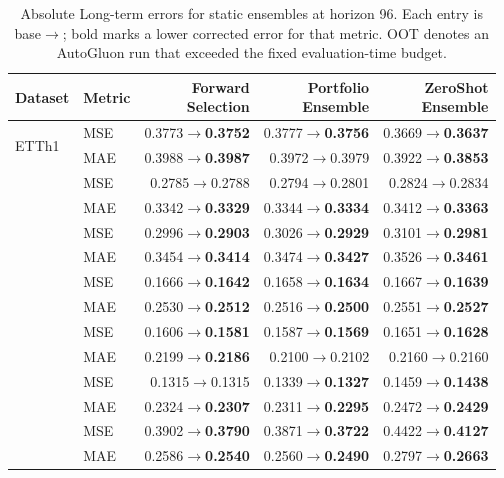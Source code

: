\begin{table}[t]
\centering
\small
\setlength{\tabcolsep}{5pt}
\caption{Absolute Long-term errors for static ensembles at horizon 96. Each entry is base$\rightarrow$\method{}; bold marks a lower corrected error for that metric. OOT denotes an AutoGluon run that exceeded the fixed evaluation-time budget.}
\label{tab:strong-long-term-absolute-ensembles}
\begin{tabular}{llrrr}
\toprule
Dataset & Metric & \shortstack{Forward\\Selection} & \shortstack{Portfolio\\Ensemble} & \shortstack{ZeroShot\\Ensemble}\\
\midrule
\multirow{2}{*}{ETTh1} & MSE & 0.3773$\rightarrow$\textbf{0.3752} & 0.3777$\rightarrow$\textbf{0.3756} & 0.3669$\rightarrow$\textbf{0.3637}\\
 & MAE & 0.3988$\rightarrow$\textbf{0.3987} & 0.3972$\rightarrow$0.3979 & 0.3922$\rightarrow$\textbf{0.3853}\\
\addlinespace[1pt]
\multirow{2}{*}{ETTh2} & MSE & 0.2785$\rightarrow$0.2788 & 0.2794$\rightarrow$0.2801 & 0.2824$\rightarrow$0.2834\\
 & MAE & 0.3342$\rightarrow$\textbf{0.3329} & 0.3344$\rightarrow$\textbf{0.3334} & 0.3412$\rightarrow$\textbf{0.3363}\\
\addlinespace[1pt]
\multirow{2}{*}{ETTm1} & MSE & 0.2996$\rightarrow$\textbf{0.2903} & 0.3026$\rightarrow$\textbf{0.2929} & 0.3101$\rightarrow$\textbf{0.2981}\\
 & MAE & 0.3454$\rightarrow$\textbf{0.3414} & 0.3474$\rightarrow$\textbf{0.3427} & 0.3526$\rightarrow$\textbf{0.3461}\\
\addlinespace[1pt]
\multirow{2}{*}{ETTm2} & MSE & 0.1666$\rightarrow$\textbf{0.1642} & 0.1658$\rightarrow$\textbf{0.1634} & 0.1667$\rightarrow$\textbf{0.1639}\\
 & MAE & 0.2530$\rightarrow$\textbf{0.2512} & 0.2516$\rightarrow$\textbf{0.2500} & 0.2551$\rightarrow$\textbf{0.2527}\\
\addlinespace[1pt]
\multirow{2}{*}{weather} & MSE & 0.1606$\rightarrow$\textbf{0.1581} & 0.1587$\rightarrow$\textbf{0.1569} & 0.1651$\rightarrow$\textbf{0.1628}\\
 & MAE & 0.2199$\rightarrow$\textbf{0.2186} & 0.2100$\rightarrow$0.2102 & 0.2160$\rightarrow$0.2160\\
\addlinespace[1pt]
\multirow{2}{*}{electricity} & MSE & 0.1315$\rightarrow$0.1315 & 0.1339$\rightarrow$\textbf{0.1327} & 0.1459$\rightarrow$\textbf{0.1438}\\
 & MAE & 0.2324$\rightarrow$\textbf{0.2307} & 0.2311$\rightarrow$\textbf{0.2295} & 0.2472$\rightarrow$\textbf{0.2429}\\
\addlinespace[1pt]
\multirow{2}{*}{traffic} & MSE & 0.3902$\rightarrow$\textbf{0.3790} & 0.3871$\rightarrow$\textbf{0.3722} & 0.4422$\rightarrow$\textbf{0.4127}\\
 & MAE & 0.2586$\rightarrow$\textbf{0.2540} & 0.2560$\rightarrow$\textbf{0.2490} & 0.2797$\rightarrow$\textbf{0.2663}\\
\bottomrule
\end{tabular}
\end{table}

